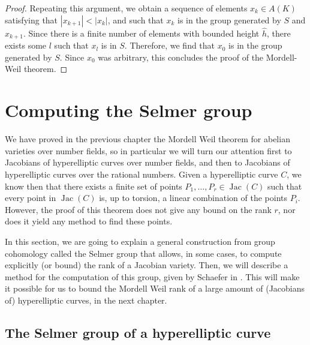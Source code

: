\documentclass[a4paper, 12pt]{amsart}
\theoremstyle{definition}
\theoremstyle{plain}
\theoremstyle{plain}
\theoremstyle{plain}
\theoremstyle{plain}
\theoremstyle{remark}
\theoremstyle{remark}
\theoremstyle{plain}
\DeclareMathOperator{\Jac}{Jac}
\begin{document}
\begin{proof}
		Repeating this argument, we obtain a sequence of elements $x_k\in A(K)$ satisfying that $|x_{k+1}|<|x_k|$, and such that $x_k$ is in the group generated by $S$ and $x_{k+1}$. Since there is a finite number of elements with bounded height $\hat{h}$, there exists some $l$ such that $x_l$ is in $S$. Therefore, we find that $x_0$ is in the group generated by $S$. Since $x_0$ was arbitrary, this concludes the proof of the Mordell-Weil theorem.
	\end{proof}
	
	
	
	
	
	
	
	
	
	
	
	\newpage
	\thispagestyle{plain}	
	\section{Computing the Selmer group}
	
	We have proved in the previous chapter the Mordell Weil theorem for abelian varieties over number fields, so in particular we will turn our attention first to Jacobians of hyperelliptic curves over number fields, and then to Jacobians of hyperelliptic curves over the rational numbers. Given a hyperelliptic curve $C$, we know then that there exists a finite set of points $P_1,\ldots,P_r\in\Jac(C)$ such that every point in $\Jac(C)$ is, up to torsion, a linear combination of the points $P_i$. However, the proof of this theorem does not give any bound on the rank $r$, nor does it yield any method to find these points.
	
	In this section, we are going to explain a general construction from group cohomology called the Selmer group that allows, in some cases, to compute explicitly (or bound) the rank of a Jacobian variety. Then, we will describe a method for the computation of this group, given by Schaefer in \cite{Schaefer_1995}. This will make it possible for us to bound the Mordell Weil rank of a large amount of (Jacobians of) hyperelliptic curves, in the next chapter.
	
	\subsection{The Selmer group of a hyperelliptic curve}
	
\end{document}

